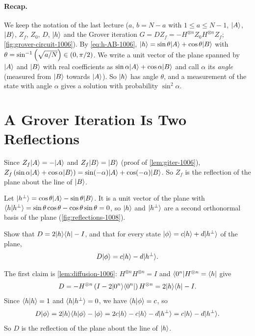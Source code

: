 
\paragraph{Recap.} We keep the notation of the last lecture ($a$, $b = N - a$ with
$1 \leq a \leq N - 1$, $\lvert A \rangle$, $\lvert B \rangle$, $Z_f$, $Z_0$, $D$, $\lvert h \rangle$ and the Grover iteration
$G = D Z_f = -H^{\otimes n} Z_0 H^{\otimes n} Z_f$; \cref{fig:grover-circuit-1006}). By
\cref{eq:h-AB-1006}, $\lvert h \rangle = \sin\theta \lvert A \rangle + \cos\theta \lvert B \rangle$ with
$\theta = \sin^{-1}\left(\sqrt{a/N}\right) \in (0, \pi/2)$. We write a unit vector
of the plane spanned by $\lvert A \rangle$ and $\lvert B \rangle$ with real coefficients as
$\sin\alpha \lvert A \rangle + \cos\alpha \lvert B \rangle$ and call $\alpha$ its \emph{angle} (measured from $\lvert B \rangle$
towards $\lvert A \rangle$). So $\lvert h \rangle$ has angle $\theta$, and a measurement of the state with angle
$\alpha$ gives a solution with probability $\sin^2\alpha$.

\section{A Grover Iteration Is Two Reflections}

Since $Z_f \lvert A \rangle = -\lvert A \rangle$ and $Z_f \lvert B \rangle = \lvert B \rangle$ (proof of \cref{lem:giter-1006}),
$Z_f \left(\sin\alpha \lvert A \rangle + \cos\alpha \lvert B \rangle\right) = \sin(-\alpha) \lvert A \rangle + \cos(-\alpha) \lvert B \rangle$.
So $Z_f$ is the reflection of the plane about the line of $\lvert B \rangle$.

Let $\lvert h^\perp \rangle = \cos\theta \lvert A \rangle - \sin\theta \lvert B \rangle$. It is a unit vector of the plane with
$\langle h \vert h^\perp \rangle = \sin\theta\cos\theta - \cos\theta\sin\theta = 0$, so $\lvert h \rangle$ and
$\lvert h^\perp \rangle$ are a second orthonormal basis of the plane (\cref{fig:reflections-1008}).

\begin{exercisebox}
\begin{exercise}\label{ex:diffusion-1008}
    Show that $D = 2\lvert h \rangle\langle h \rvert - I$, and that for every state
    $\lvert \phi \rangle = c \lvert h \rangle + d \lvert h^\perp \rangle$ of the plane,
    \[D \lvert \phi \rangle = c \lvert h \rangle - d \lvert h^\perp \rangle.\]
\end{exercise}
\tcblower
\begin{wsolution}
    The first claim is \cref{lem:diffusion-1006}: $H^{\otimes n} H^{\otimes n} = I$ and
    $\langle 0^n \rvert H^{\otimes n} = \langle h \rvert$ give
    \[D = -H^{\otimes n}\left(I - 2\lvert 0^n \rangle\langle 0^n \rvert\right)H^{\otimes n} = 2\lvert h \rangle\langle h \rvert - I.\]
    Since $\langle h \vert h \rangle = 1$ and $\langle h \vert h^\perp \rangle = 0$, we have $\langle h \vert \phi \rangle = c$, so
    \[D\lvert \phi \rangle = 2\lvert h \rangle\langle h \vert \phi \rangle - \lvert \phi \rangle = 2c\lvert h \rangle - c\lvert h \rangle - d\lvert h^\perp \rangle
        = c\lvert h \rangle - d\lvert h^\perp \rangle.\]
    So $D$ is the reflection of the plane about the line of $\lvert h \rangle$.
\end{wsolution}
\end{exercisebox}

